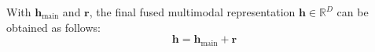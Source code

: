 \documentclass[letterpaper]{article} %
\begin{document}

With $\mathbf{h}_{\mathrm{main}}$ and $\mathbf{r}$, the final fused multimodal representation $\mathbf{h}\in\mathbb{R}^{D}$ can be obtained as follows:
\begin{equation}
\mathbf{h}
=\mathbf{h}_{\mathrm{main}}+\mathbf{r}
\label{eq:final_representation}
\end{equation}

\end{document}
